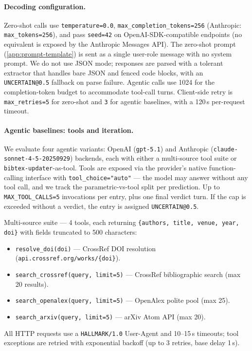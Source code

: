 \paragraph{Decoding configuration.}
Zero-shot calls use \texttt{temperature=0.0}, \texttt{max\_completion\_tokens=256} (Anthropic: \texttt{max\_tokens=256}), and pass \texttt{seed=42} on OpenAI-SDK-compatible endpoints (no equivalent is exposed by the Anthropic Messages API).
The zero-shot prompt (\cref{app:prompt-template}) is sent as a single user-role message with no system prompt.
We do not use JSON mode; responses are parsed with a tolerant extractor that handles bare JSON and fenced code blocks, with an \texttt{UNCERTAIN@0.5} fallback on parse failure.
Agentic calls use 1024 for the completion-token budget to accommodate tool-call turns.
Client-side retry is \texttt{max\_retries=5} for zero-shot and \texttt{3} for agentic baselines, with a 120\,s per-request timeout.

\paragraph{Agentic baselines: tools and iteration.}
We evaluate four agentic variants: OpenAI (\texttt{gpt-5.1}) and Anthropic (\texttt{claude-sonnet-4-5-20250929}) backends, each with either a multi-source tool suite or \texttt{bibtex-updater}-as-tool.
Tools are exposed via the provider's native function-calling interface with \texttt{tool\_choice="auto"} --- the model may answer without any tool call, and we track the parametric-vs-tool split per prediction.
Up to \texttt{MAX\_TOOL\_CALLS=5} invocations per entry, plus one final verdict turn.
If the cap is exceeded without a verdict, the entry is assigned \texttt{UNCERTAIN@0.5}.

Multi-source suite --- 4 tools, each returning \texttt{\{authors, title, venue, year, doi\}} with fields truncated to 500 characters:
\begin{itemize}
    \item \texttt{resolve\_doi(doi)} --- CrossRef DOI resolution (\texttt{api.crossref.org/works/\{doi\}}).
    \item \texttt{search\_crossref(query, limit=5)} --- CrossRef bibliographic search (max 20 results).
    \item \texttt{search\_openalex(query, limit=5)} --- OpenAlex polite pool (max 25).
    \item \texttt{search\_arxiv(query, limit=5)} --- arXiv Atom API (max 20).
\end{itemize}
All HTTP requests use a \texttt{HALLMARK/1.0} User-Agent and 10--15\,s timeouts; tool exceptions are retried with exponential backoff (up to 3 retries, base delay 1\,s).

